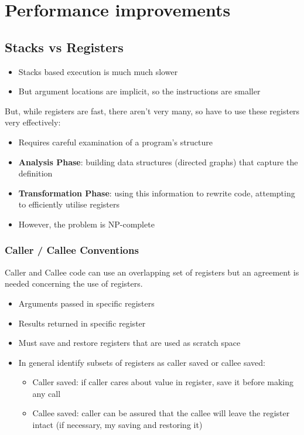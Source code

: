 \documentclass{article}
\begin{document}
\section{Performance improvements}
\subsection{Stacks vs Registers}
\begin{itemize}
	\item Stacks based execution is much much slower
	\item But argument locations are implicit, so the instructions are smaller
\end{itemize}

But, while registers are fast, there aren't very many, so have to use these registers very effectively:
\begin{itemize}
	\item Requires careful examination of a program's structure
	\item \textbf{Analysis Phase}: building data structures (directed graphs) that capture the definition
	\item \textbf{Transformation Phase}: using this information to rewrite code, attempting to efficiently utilise registers
	\item However, the problem is NP-complete
\end{itemize}

\subsubsection{Caller / Callee Conventions}
Caller and Callee code can use an overlapping set of registers but an agreement is needed concerning the use of registers.
\begin{itemize}
	\item Arguments passed in specific registers
	\item Results returned in specific register
	\item Must save and restore registers that are used as scratch space
	\item In general identify subsets of registers as caller saved or callee saved:
	\begin{itemize}
		\item Caller saved: if caller cares about value in register, save it before making any call
		\item Callee saved: caller can be assured that the callee will leave the register intact (if necessary, my saving and restoring it)
	\end{itemize}
\end{itemize}
\end{document}
